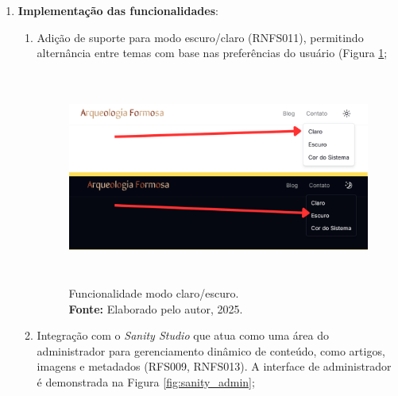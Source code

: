 \begin{enumerate}
            
        \item \textbf{Implementação das funcionalidades}:
            \begin{enumerate}
            \item Adição de suporte para modo escuro/claro (RNFS011), permitindo alternância entre temas com base nas preferências do usuário (Figura \ref{fig:claro escuro};

                    \begin{figure}[H]
                        \centering
                        \includegraphics[height=7cm, keepaspectratio]{img/site/claro escuro.png}
                        \caption{ Funcionalidade modo claro/escuro. \\
                            \textbf{Fonte:} Elaborado pelo autor, 2025.}
                        \label{fig:claro escuro}
                    \end{figure}
                                
            \item Integração com o \textit{Sanity Studio} que atua como uma área do administrador para gerenciamento dinâmico de conteúdo, como artigos, imagens e metadados (RFS009, RNFS013). A interface de administrador é demonstrada na Figura \ref{fig:sanity_admin};


\end{enumerate}
\end{enumerate}
